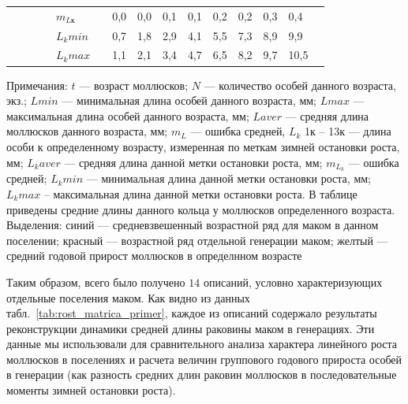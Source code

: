 \begin{table}[p]
\begin{tabularx}{\textwidth}{|X|X|XX|XX|XXXXXXXXX|}
                &    &       &       & $m_{Lк}$      &  & 0,0 & 0,0 & 0,1 & 0,1 & 0,2 & 0,2 & 0,3 & 0,4  &      \\
                &    &       &       & $L_{k} min$  &   & 0,7 & 1,8 & 2,9 & 4,1 & 5,5 & 7,3 & 8,9 & 9,9  &      \\
                &    &       &       &  $L_{k} max$ &   & 1,1 & 2,1 & 3,4 & 4,7 & 6,5 & 8,2 & 9,7 & 10,5 &     \\ \hline
    \end{tabularx}
    \footnotesize{Примечания: $t$ --- возраст моллюсков; 
        $N$ --- количество  особей  данного возраста, экз.; 
        $L min$  ---  минимальная   длина  особей   данного   возраста,   мм;   
        $L max$   ---   максимальная   длина   особей   данного   возраста,   мм; 
        $L aver$ --- средняя длина моллюсков данного возраста, мм; 
        $m_L$ --- ошибка средней, 
        $L_k$ 1к -- 13к --- длина особи к определенному возрасту, измеренная по меткам зимней остановки роста, мм;
        $L_k aver$ --- средняя длина данной метки остановки роста, мм; 
        $m_{L_k}$ --- ошибка средней; 
        $L_k min$ --- минимальная длина данной метки остановки роста, мм; 
        $L_k   max$   --   максимальная   длина   данной   метки   остановки   роста.   
        В   таблице   приведены средние длины данного кольца у моллюсков определенного возраста. \\[1em]
    Выделения: синий --- средневзвешенный возрастной ряд для маком в данном поселении;
        красный --- возрастной ряд отдельной генерации маком;
        желтый --- средний годовой прирост моллюсков в определнном возрасте}
\end{table}
Таким образом, всего было получено $14$ описаний, условно характеризующих отдельные поселения маком. 
Как видно из данных табл.~\ref{tab:rost_matrica_primer}, каждое из описаний содержало результаты реконструкции динамики средней длины раковины маком в генерациях. 
Эти данные мы использовали для сравнительного анализа характера линейного роста моллюсков в поселениях и расчета величин группового годового прироста особей в генерации (как разность средних длин раковин моллюсков в последовательные моменты зимней остановки роста).

